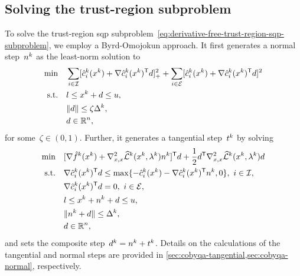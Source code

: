 \subsection{Solving the trust-region  subproblem}
\label{subsec:solving-trust-region-subproblem}

To solve the trust-region \gls{sqp} subproblem~\cref{eq:derivative-free-trust-region-sqp-subproblem}, we employ a Byrd-Omojokun approach.
It first generates a normal step~$\nstep[k]$ as the least-norm solution to
\begin{subequations}
    \label{eq:cobyqa-normal}
    \begin{align}
        \min        & \quad \sum_{i \in \iub} \posp{\conm[k]{i}(\iter[k]) + \nabla \conm[k]{i}(\iter[k])^{\T} \step}^2 + \sum_{i \in \ieq} [\conm[k]{i}(\iter[k]) + \nabla \conm[k]{i}(\iter[k])^{\T} \step]^2\\
        \text{s.t.} & \quad \xl \le \iter[k] + \step \le \xu,\\
                    & \quad \norm{\step} \le \zeta \rad[k],\\
                    & \quad \step \in \R^n,
    \end{align}
\end{subequations}
for some~$\zeta \in (0, 1)$.
Further, it generates a tangential step~$\tstep[k]$ by solving
\begin{subequations}
    \label{eq:cobyqa-tangential-original}
    \begin{align}
        \min        & \quad [\nabla \objm[k](\iter[k]) + \nabla_{x, x}^2 \lagm[k](\iter[k], \lm[k]) \nstep[k]]^{\T} \step + \frac{1}{2} \step^{\T} \nabla_{x, x}^2 \lagm[k](\iter[k], \lm[k]) \step\\
        \text{s.t.} & \quad \nabla \conm[k]{i}(\iter[k])^{\T} \step \le \max \set{-\conm[k]{i}(\iter[k]) - \nabla \conm[k]{i}(\iter[k])^{\T} \nstep[k], 0}, ~ i \in \iub,\\
                    & \quad \nabla \conm[k]{i}(\iter[k])^{\T} \step = 0, ~ i \in \ieq,\\
                    & \quad \xl \le \iter[k] + \nstep[k] + \step \le \xu,\\
                    & \quad \norm{\nstep[k] + \step} \le \rad[k],\\
                    & \quad \step \in \R^n,
    \end{align}
\end{subequations}
and sets the composite step~$\step[k] = \nstep[k] + \tstep[k]$.
Details on the calculations of the tangential and normal steps are provided in \cref{sec:cobyqa-tangential,sec:cobyqa-normal}, respectively.
